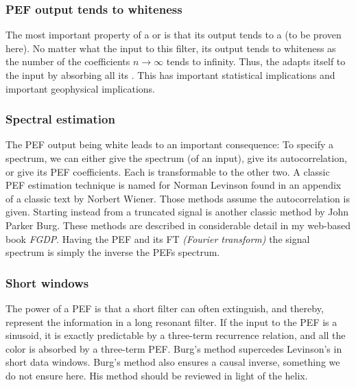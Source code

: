 \subsubsection{PEF output tends to whiteness}
The most important property of a 
or  is that
its output tends to a  (to be proven here).
No matter what the input to this filter,
its output tends to whiteness as the number of the coefficients
$n \rightarrow \infty$ tends to infinity.
Thus, the  adapts itself to the input
by absorbing all its .
This has important statistical implications and
important geophysical implications.

\subsubsection{Spectral estimation}
\par
The PEF output being white leads to an important consequence:
To specify a spectrum,
we can either give the spectrum (of an input),
give its autocorrelation,
or give its PEF coefficients.
Each is transformable to the other two.
A classic PEF estimation technique is named for Norman Levinson
found in an appendix of a classic text by Norbert Wiener.
Those methods assume the autocorrelation is given.
Starting instead from a truncated signal is another classic method by John Parker Burg.
These methods are described in considerable detail
in my web-based book {\em FGDP}.
Having the PEF and its FT {\em (Fourier transform)}
the signal spectrum is simply the inverse the PEFs spectrum.

\subsubsection{Short windows}
\par
The power of a PEF is that a short filter can often extinguish,
and thereby,
represent the information in a long resonant filter.
If the input to the PEF is a sinusoid,
it is exactly predictable by a three-term recurrence relation,
and all the color is absorbed by a three-term PEF.
Burg's method supercedes Levinson's in short data windows.
Burg's method also ensures a causal inverse,
something we do not ensure here.
His method should be reviewed in light of the helix.

